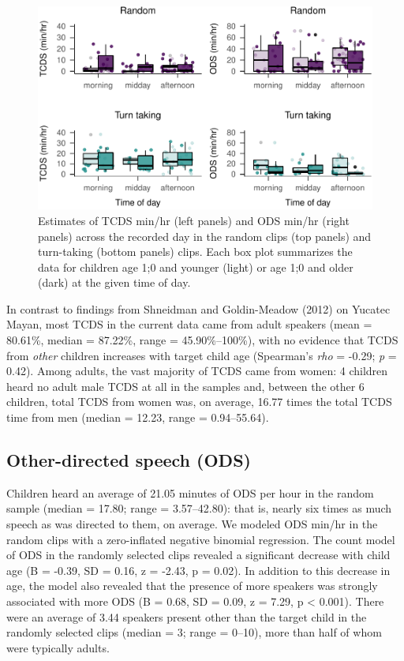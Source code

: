 \documentclass[floatsintext,man]{apa6}
\theoremstyle{definition}
\theoremstyle{definition}
\theoremstyle{definition}
\theoremstyle{remark}
\begin{document}
\begin{figure}
\centering
\includegraphics{Tseltal-CLE_files/figure-latex/fig5-1.pdf}
\caption{\label{fig:fig5}Estimates of TCDS min/hr (left panels) and ODS
min/hr (right panels) across the recorded day in the random clips (top
panels) and turn-taking (bottom panels) clips. Each box plot summarizes
the data for children age 1;0 and younger (light) or age 1;0 and older
(dark) at the given time of day.}
\end{figure}

In contrast to findings from Shneidman and Goldin-Meadow (2012) on
Yucatec Mayan, most TCDS in the current data came from adult speakers
(mean = 80.61\%, median = 87.22\%, range = 45.90\%--100\%), with no
evidence that TCDS from \emph{other} children increases with target
child age (Spearman's \emph{rho} = -0.29; \emph{p} = 0.42). Among
adults, the vast majority of TCDS came from women: 4 children heard no
adult male TCDS at all in the samples and, between the other 6 children,
total TCDS from women was, on average, 16.77 times the total TCDS time
from men (median = 12.23, range = 0.94--55.64).

\subsection{Other-directed speech
(ODS)}\label{other-directed-speech-ods}

Children heard an average of 21.05 minutes of ODS per hour in the random
sample (median = 17.80; range = 3.57--42.80): that is, nearly six times
as much speech as was directed to them, on average. We modeled ODS
min/hr in the random clips with a zero-inflated negative binomial
regression. The count model of ODS in the randomly selected clips
revealed a significant decrease with child age (B = -0.39, SD = 0.16, z
= -2.43, p = 0.02). In addition to this decrease in age, the model also
revealed that the presence of more speakers was strongly associated with
more ODS (B = 0.68, SD = 0.09, z = 7.29, p \textless{} 0.001). There
were an average of 3.44 speakers present other than the target child in
the randomly selected clips (median = 3; range = 0--10), more than half
of whom were typically adults.
\end{document}
